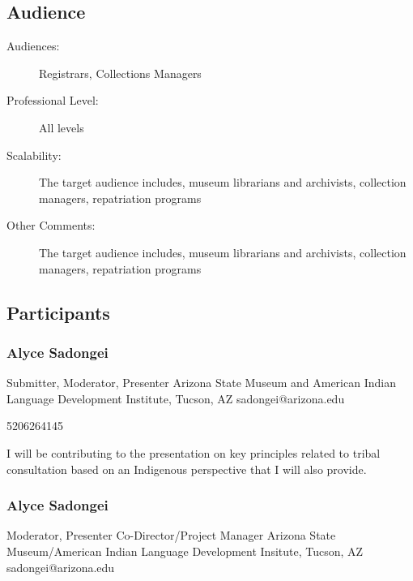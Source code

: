\documentclass{report}
\begin{document}
              \subsection*{Audience}
                \begin{description}
                  \item [Audiences:]Registrars, Collections Managers~
                  \item[Professional Level:]All levels~
                \item[Scalability:] The target audience includes, museum librarians and archivists, collection managers, repatriation programs

							
              \item[Other Comments:] The target audience includes, museum librarians and archivists, collection managers, repatriation programs
              \end{description}
            \subsection*{Participants}
              \subsubsection*{ Alyce Sadongei }
              Submitter, Moderator, Presenter\newline
              \newline
              Arizona State Museum and American Indian Language Development Institute, Tucson, AZ
              \newline
              sadongei@arizona.edu\newline
              
              5206264145\newline

              I will be contributing to the presentation on key principles related to tribal consultation based on an Indigenous perspective that I will also provide.\newline


              
                \subsubsection*{ Alyce Sadongei }
                Moderator, Presenter\newline
                Co-Director/Project Manager\newline
                Arizona State Museum/American Indian Language Development Insitute, Tucson, AZ
                \newline
                sadongei@arizona.edu\newline
                
\end{document}
